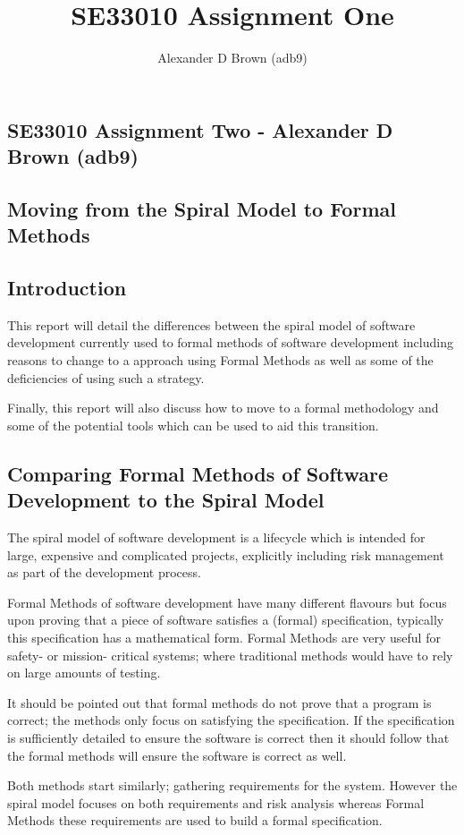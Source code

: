 \documentclass[10pt, a4paper, notitlepage, fleqn]{article}
\title{SE33010 Assignment One}
\author{Alexander D Brown (adb9)}
\begin{document}
\begin{centering}
\section*{SE33010 Assignment Two - Alexander D Brown (adb9)}
\subsection*{Moving from the Spiral Model to Formal Methods}
\end{centering}

\subsection*{Introduction}
This report will detail the differences between the spiral model of software development currently
used to formal methods of software development including reasons to change to a approach using 
Formal Methods as well as some of the deficiencies of using such a strategy.

Finally, this report will also discuss how to move to a formal methodology and some of the 
potential tools which can be used to aid this transition.

\subsection*{Comparing Formal Methods of Software Development to the Spiral Model}
The spiral model of software development is a lifecycle which is intended for large, expensive and
complicated projects, explicitly including risk management as part of the development process.

Formal Methods of software development have many different flavours but focus upon proving that a
piece of software satisfies a (formal) specification, typically this specification has a 
mathematical form. Formal Methods are very useful for safety- or mission- critical systems; where
traditional methods would have to rely on large amounts of testing.

It should be pointed out that formal methods do not prove that a program is correct; the methods
only focus on satisfying the specification. If the specification is sufficiently detailed to
ensure the software is correct then it should follow that the formal methods will ensure the
software is correct as well.

Both methods start similarly; gathering requirements for the system. However the spiral model 
focuses on both requirements and risk analysis whereas Formal Methods these requirements are used
to build a formal specification.
\end{document}
